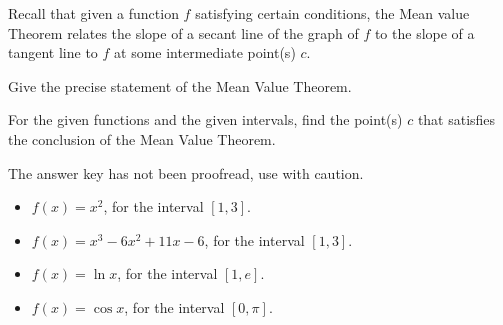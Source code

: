 Recall that given a function $f$ satisfying certain conditions, the Mean value Theorem relates the slope of a secant line of the graph of $f$ to the slope of a tangent line to $f$ at some intermediate point(s) $c$.

Give the precise statement of the Mean Value Theorem. 

For the given functions and the given intervals, find the point(s) $c$ that satisfies the conclusion of the Mean Value Theorem.

The answer key has not been proofread, use with caution.
\begin{itemize}
\item $\displaystyle f(x)=x^2$, for the interval $[1,3]$.

\item $\displaystyle f(x)=x^3-6x^2+11x-6$, for the interval $[1,3]$.

\item $\displaystyle f(x)=\ln x$, for the interval $[1,e]$.

\item $\displaystyle f(x)=\cos x$, for the interval $[0,\pi]$.

\end{itemize}